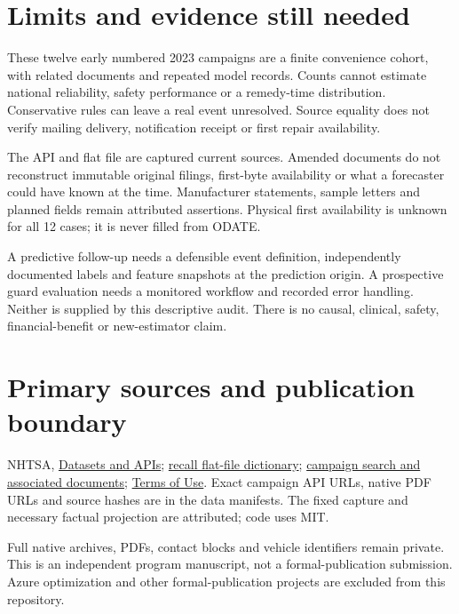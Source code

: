 \documentclass[11pt,letterpaper]{article}
\newcommand{\CaseCount}{12}
\begin{document}
\section*{Limits and evidence still needed}
These twelve early numbered 2023 campaigns are a finite convenience cohort, with related documents and repeated model records. Counts cannot estimate national reliability, safety performance or a remedy-time distribution. Conservative rules can leave a real event unresolved. Source equality does not verify mailing delivery, notification receipt or first repair availability.

The API and flat file are captured current sources. Amended documents do not reconstruct immutable original filings, first-byte availability or what a forecaster could have known at the time. Manufacturer statements, sample letters and planned fields remain attributed assertions. Physical first availability is unknown for all \CaseCount{} cases; it is never filled from ODATE.

A predictive follow-up needs a defensible event definition, independently documented labels and feature snapshots at the prediction origin. A prospective guard evaluation needs a monitored workflow and recorded error handling. Neither is supplied by this descriptive audit. There is no causal, clinical, safety, financial-benefit or new-estimator claim.

\section*{Primary sources and publication boundary}
{\small
NHTSA, \href{https://www.nhtsa.gov/nhtsa-datasets-and-apis}{Datasets and APIs};
\href{https://static.nhtsa.gov/odi/ffdd/rcl/RCL.txt}{recall flat-file dictionary};
\href{https://www.nhtsa.gov/recalls}{campaign search and associated documents};
\href{https://www.nhtsa.gov/about-nhtsa/terms-use}{Terms of Use}.
Exact campaign API URLs, native PDF URLs and source hashes are in the data manifests. The fixed capture and necessary factual projection are attributed; code uses MIT.

Full native archives, PDFs, contact blocks and vehicle identifiers remain private. This is an independent program manuscript, not a formal-publication submission. Azure optimization and other formal-publication projects are excluded from this repository.
}
\end{document}
